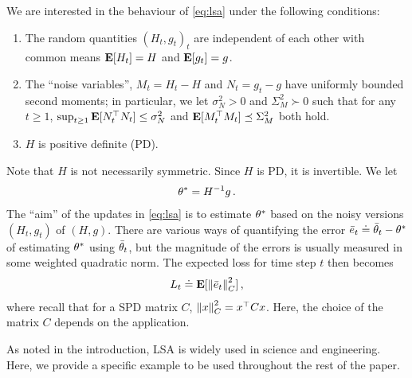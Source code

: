 We are interested in the behaviour of \eqref{eq:lsa} under the following conditions:
\begin{assumption}\label{genlsa}
\mbox{}
\vspace*{-0.14in}

\begin{enumerate}
\item\label{mart} 
The random quantities $(H_t,g_t)_t$  are independent of each other with common means $\mathbf{E}[ H_t] = H$ and $\mathbf{E}[g_t] = g$.

\item \label{noise} The ``noise variables'', $M_t = H_t - H$ and $N_t = g_t - g$ have uniformly bounded second moments;
in particular, we let $\sigma_N^2>0$ and $\Sigma_M^2\succ 0$ such that for any $t\ge 1$,
$\sup_{t\ge 1} \mathbf{E}[N_t^\top N_t]\le \sigma_N^2$ and
$\mathbf{E}[M_t^\top M_t]\preceq \Sigma_M^2$ both hold.

\item \label{mat} $H$ is positive definite (PD). %
\end{enumerate}
\end{assumption}
Note that $H$ is not necessarily symmetric.
Since $H$ is PD, it is invertible. We let 
\begin{align*}
\theta^* = H^{-1} g\,.
\end{align*}
The ``aim'' of the updates in \eqref{eq:lsa} is to estimate $\theta^*$ based on the noisy versions $(H_t,g_t)$ of $(H,g)$.
There are various ways of quantifying the error $\bar{e}_t \doteq \bar{\theta}_t - \theta^*$ of estimating $\theta^*$ using $\bar{\theta}_t$, but the magnitude
of the errors is usually measured in some weighted quadratic norm. The expected loss for time step $t$ then becomes
\begin{align*}
L_t \doteq \mathbf{E}[ \left\| \bar{e}_t\right\|_{C}^2 ]\,,
\end{align*}
where recall that for a SPD matrix $C$, $\left\| x\right\|_C^2 = x^\top C x$.
Here, the choice of the matrix $C$ depends on the application.


As noted in the introduction, LSA is widely used in science and engineering. Here, we provide a specific example to be used throughout the rest of the paper.
\begin{example}
\label{ex:leastsquares}
\end{example}


